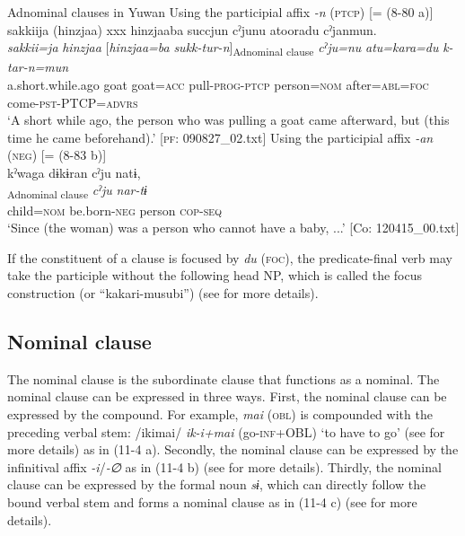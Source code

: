 \ea\label{ex:11-3}  Adnominal clauses in Yuwan
  \ea Using the participial affix \textit{{}-n} (\textsc{ptcp}) [= (8-80 a)]\\
   \glll sakkiija  (hinzjaa)  xxx  hinzjaaba  succjun cˀjunu  atooradu  cˀjanmun.\\
    \textit{sakkii=ja}  \textit{hinzjaa}    [\textit{hinzjaa=ba}  \textit{sukk-tur-{n}}]\textsubscript{Adnominal clause}   \textit{cˀju=nu}  \textit{atu=kara=du}  \textit{k-tar-n=mun}\\
    a.short.while.ago  goat    goat=\textsc{acc}  pull-\textsc{prog}-\textsc{ptcp}  person=\textsc{nom}  after=\textsc{abl}=\textsc{foc}  come-\textsc{pst}-PTCP=\textsc{advrs}\\
   \glt ‘A short while ago, the person who was pulling a goat came afterward, but (this time he came beforehand).’    [\textsc{pf}: 090827\_02.txt]
  \ex Using the participial affix \textit{{}-an} (\textsc{neg}) [= (8-83 b)]\\
   \glll kˀwaga  dɨkɨran  cˀju  natɨ,\\
    [\textit{kˀwa=ga}  \textit{dɨkɨr-\Highlight{an}}]\textsubscript{Adnominal clause}  \textit{cˀju}  \textit{nar-tɨ}\\
    child=\textsc{nom}  be.born-\textsc{neg}  person  \textsc{cop}-\textsc{seq}\\
    ‘Since (the woman) was a person who cannot have a baby, ...’    [Co: 120415\_00.txt]
\z
\z

If the constituent of a clause is focused by \textit{du} (\textsc{foc}), the predicate-final verb may take the participle without the following head NP, which is called the focus construction (or “kakari-musubi”) (see  for more details).

\subsection{Nominal clause}\label{sec:11.1.3}

The nominal clause is the subordinate clause that functions as a nominal. The nominal clause can be expressed in three ways. First, the nominal clause can be expressed by the compound. For example, \textit{mai} (\textsc{obl}) is compounded with the preceding verbal stem: /ikimai/ \textit{ik-i+mai} (go-\textsc{inf}+OBL) ‘to have to go’ (see  for more details) as in (11-4 a). Secondly, the nominal clause can be expressed by the infinitival affix \textit{{}-i}/\textit{{}-∅} as in (11-4 b) (see  for more details). Thirdly, the nominal clause can be expressed by the formal noun \textit{sɨ}, which can directly follow the bound verbal stem and forms a nominal clause as in (11-4 c) (see  for more details).

